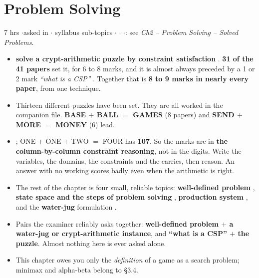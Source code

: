 \section{Problem Solving}

{\color{sub}\footnotesize 7 hrs \gap$\cdot$\gap asked in 
\gap$\cdot$ syllabus sub-topics \gap$\cdot$\gap {} \gap$\cdot$\gap {} \gap$\cdot$\gap {}: see
\emph{Ch2 -- Problem Solving -- Solved Problems}.}

\begin{itemize}
  \item {}
        \textbf{solve a crypt-arithmetic puzzle by constraint satisfaction} .
        \textbf{31 of the 41 papers} set it, for 6 to 8 marks, and it is almost always
        preceded by a 1 or 2 mark \emph{``what is a CSP''} . Together that is
        \textbf{8 to 9 marks in nearly every paper}, from one technique.
  \item Thirteen different puzzles have been set. They are all worked in the companion
        file. \textbf{BASE $+$ BALL $=$ GAMES} (8 papers) and \textbf{SEND $+$ MORE $=$
        MONEY} (6) lead.
  \item {};
        ONE $+$ ONE $+$ TWO $=$ FOUR has \textbf{107}. So the marks are in
        \textbf{the column-by-column constraint reasoning}, not in the digits. Write the
        variables, the domains, the constraints and the carries, then reason. An answer
        with no working scores badly even when the arithmetic is right.
  \item The rest of the chapter is four small, reliable topics:
        \textbf{well-defined problem} , \textbf{state space and the steps of problem
        solving} , \textbf{production system} , and the
        \textbf{water-jug} formulation .
  \item Pairs the examiner reliably asks together: \textbf{well-defined problem $+$ a
        water-jug or crypt-arithmetic instance}, and \textbf{``what is a CSP'' $+$ the
        puzzle}. Almost nothing here is ever asked alone.
  \item {} This chapter
        owes you only the \emph{definition} of a game as a search problem; minimax and
        alpha-beta belong to \S3.4.
\end{itemize}

